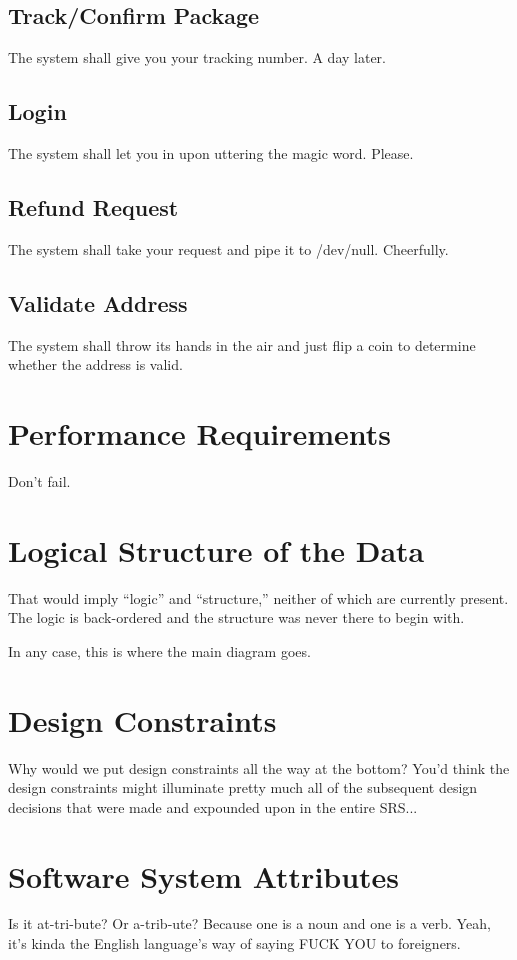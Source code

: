 \documentclass{scrreprt}
\begin{document}
\subsection{Track/Confirm Package}

The system shall give you your tracking number. A day later.

\subsection{Login}

The system shall let you in upon uttering the magic word. Please.

\subsection{Refund Request}

The system shall take your request and pipe it to /dev/null. Cheerfully.

\subsection{Validate Address}

The system shall throw its hands in the air and just flip a coin to determine 
whether the address is valid.

\section{Performance Requirements}

Don't fail.

\section{Logical Structure of the Data}

That would imply ``logic'' and ``structure,'' neither of which are 
currently present. The logic is back-ordered and the structure was 
never there to begin with.

In any case, this is where the main diagram goes.

\section{Design Constraints}

Why would we put design constraints all the way at the bottom? You'd think 
the design constraints might illuminate pretty much all of the subsequent 
design decisions that were made and expounded upon in the entire SRS...

\section{Software System Attributes}

Is it at-tri-bute? Or a-trib-ute? Because one is a noun and one is a verb. 
Yeah, it's kinda the English language's way of saying FUCK YOU to foreigners.

\end{document}
